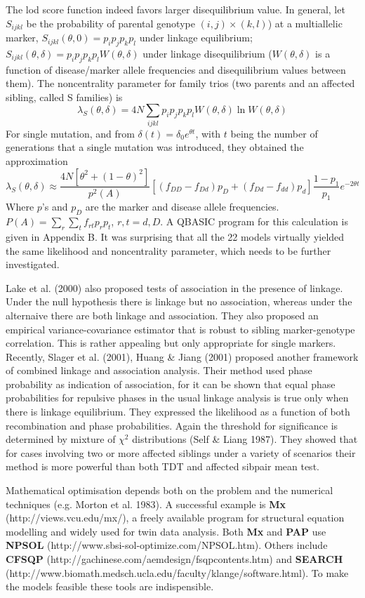 The lod score function indeed favors larger disequilibrium value.  In general,
let $S_{ijkl}$ be the probability of parental genotype $(i,j)\times (k,l)$) at
a multiallelic marker, $S_{ijkl}(\theta, 0)=p_ip_jp_kp_l$ under linkage
equilibrium; $S_{ijkl}(\theta,\delta)=p_ip_jp_kp_lW(\theta,\delta)$ under
linkage disequilibrium ($W(\theta,\delta)$ is a function of disease/marker
allele frequencies and disequilibrium values between them).  The noncentrality
parameter for family trios (two parents and an affected sibling, called S
families) is $$\lambda_S(\theta,\delta)=4N
\sum_{ijkl}p_ip_jp_kp_lW(\theta,\delta)\ln W(\theta,\delta)$$ For single
mutation, and from $\delta(t)=\delta_0e^{\theta t}$, with $t$ being the number
of generations that a single mutation was introduced, they obtained the
approximation $$\lambda_S(\theta,\delta) \approx
\frac{4N[\theta^2+(1-\theta)^2]}{p^2(A)}\left[ (f_{DD}-f_{Dd})p_D
+(f_{Dd}-f_{dd})p_d\right]\frac{1-p_1}{p_1} e^{-2\theta t}$$ Where $p$'s and
$p_D$ are the marker and disease allele frequencies.
$P(A)=\sum_{r}\sum_{t}f_{rt}p_rp_t$, $r,t=d,D$.  A QBASIC program for this
calculation is given in Appendix B.  It was surprising that all the 22 models
virtually yielded the same likelihood and noncentrality parameter, which needs
to be further investigated.

Lake et al.  (2000) also proposed tests of association in the presence of
linkage.  Under the null hypothesis there is linkage but no association,
whereas under the alternaive there are both linkage and association.  They also
proposed an empirical variance-covariance estimator that is robust to sibling
marker-genotype correlation.  This is rather appealing but only appropriate for
single markers.  Recently, Slager et al.  (2001), Huang \& Jiang (2001)
proposed another framework of combined linkage and association analysis.  Their
method used phase probability as indication of association, for it can be shown
that equal phase probabilities for repulsive phases in the usual linkage
analysis is true only when there is linkage equilibrium.  They expressed the
likelihood as a function of both recombination and phase probabilities.  Again
the threshold for significance is determined by mixture of $\chi^2$
distributions (Self \& Liang 1987).  They showed that for cases involving two
or more affected siblings under a variety of scenarios their method is more
powerful than both TDT and affected sibpair mean test.

Mathematical optimisation depends both on the problem and the numerical
techniques (e.g.  Morton et al.  1983).  A successful example is {\bf Mx}
(http://views.vcu.edu/mx/), a freely available program for structural equation
modelling and widely used for twin data analysis.  Both {\bf Mx} and {\bf PAP}
use {\bf NPSOL} (http://www.sbsi-sol-optimize.com/NPSOL.htm).  Others include
{\bf CFSQP} (http://gachinese.com/aemdesign/fsqpcontents.htm) and {\bf SEARCH}
(http://www.biomath.medsch.ucla.edu/faculty/klange/software.html).  To make the
models feasible these tools are indispensible.


